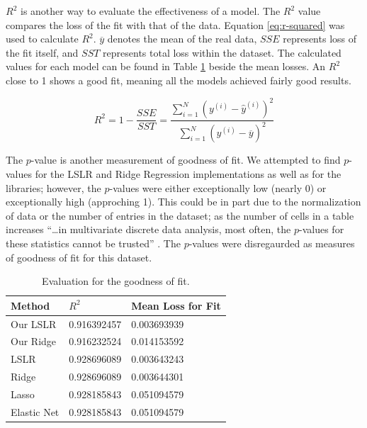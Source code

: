 \documentclass[letterpaper]{article} %
\begin{document}
$R^2$ is another way to evaluate the effectiveness of a model.
The $R^2$ value compares the loss of the fit with that of the data.
Equation \ref{eq:r-squared} was used to calculate $R^2$.
$\overline{y}$ denotes the mean of the real data,
$SSE$ represents loss of the fit itself,
and $SST$ represents total loss within the dataset.
The calculated values for each model can be found in Table \ref{tbl:goodness} beside the mean losses.
An $R^2$ close to 1 shows a good fit, meaning all the models achieved fairly good results.

\begin{equation}
\label{eq:r-squared}
R^2 = 1 - \frac{SSE}{SST} = \frac{\sum_{i=1}^{N}(y^{(i)} - \hat{y}^{(i)})^2}{\sum_{i=1}^{N}(y^{(i)} - \overline{y})^2}
\end{equation}

The $p$-value is another measurement of goodness of fit.
We attempted to find $p$-values for the LSLR and Ridge Regression
implementations as well as for the libraries; however,
the $p$-values were either exceptionally low (nearly 0) or
exceptionally high (approching 1).
This could be in part due to the normalization of data
or the number of entries in the dataset;
as the number of cells in a table increases
``\dots in multivariate discrete data analysis, most often,
the $p$-values for these statistics cannot be trusted'' \cite{goodness}.
The $p$-values were disregaurded as measures of goodness of fit for this dataset.

\begin{table}[t]
\begin{centering}
\bgroup
\def\arraystretch{1.5}
\begin{tabular}{| m{} | m{} | m{}|} 
\hline
Method & $R^2$ & Mean Loss for Fit \\ 
\hline
\hline
Our LSLR & 0.916392457 & 0.003693939 \\
\hline
Our Ridge & 0.916232524 & 0.014153592 \\
\hline
LSLR & 0.928696089 & 0.003643243 \\
\hline
Ridge & 0.928696089 & 0.003644301 \\
\hline
Lasso & 0.928185843 & 0.051094579 \\
\hline
Elastic Net & 0.928185843 & 0.051094579 \\
\hline
\end{tabular}
\caption{Evaluation for the goodness of fit.}
\label{tbl:goodness}
\egroup
\end{centering}
\end{table}
\end{document}
